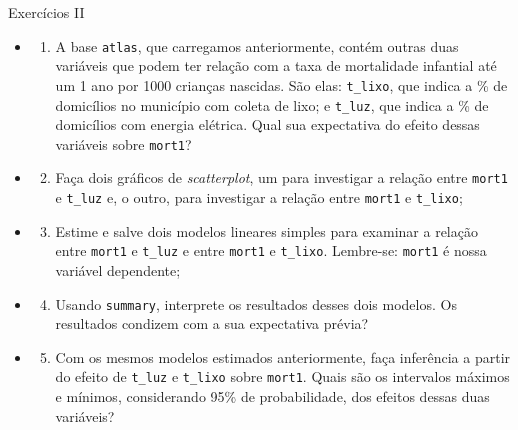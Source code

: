 \documentclass[
  9pt,
  ignorenonframetext,
  aspectratio=169]{beamer}
\providecommand{\tightlist}{%
  \setlength{\itemsep}{0pt}\setlength{\parskip}{0pt}}
\begin{document}
\begin{frame}[fragile]{Exercícios II}
\protect\hypertarget{exercuxedcios-ii}{}
\begin{itemize}
\item
  \begin{enumerate}
  [1)]
  \tightlist
  \item
    A base \texttt{atlas}, que carregamos anteriormente, contém outras
    duas variáveis que podem ter relação com a taxa de mortalidade
    infantial até um 1 ano por 1000 crianças nascidas. São elas:
    \texttt{t\_lixo}, que indica a \% de domicílios no município com
    coleta de lixo; e \texttt{t\_luz}, que indica a \% de domicílios com
    energia elétrica. Qual sua expectativa do efeito dessas variáveis
    sobre \texttt{mort1}?
  \end{enumerate}
\item
  \begin{enumerate}
  [1)]
  \setcounter{enumi}{1}
  \tightlist
  \item
    Faça dois gráficos de \emph{scatterplot}, um para investigar a
    relação entre \texttt{mort1} e \texttt{t\_luz} e, o outro, para
    investigar a relação entre \texttt{mort1} e \texttt{t\_lixo};
  \end{enumerate}
\item
  \begin{enumerate}
  [1)]
  \setcounter{enumi}{2}
  \tightlist
  \item
    Estime e salve dois modelos lineares simples para examinar a relação
    entre \texttt{mort1} e \texttt{t\_luz} e entre \texttt{mort1} e
    \texttt{t\_lixo}. Lembre-se: \texttt{mort1} é nossa variável
    dependente;
  \end{enumerate}
\item
  \begin{enumerate}
  [1)]
  \setcounter{enumi}{3}
  \tightlist
  \item
    Usando \texttt{summary}, interprete os resultados desses dois
    modelos. Os resultados condizem com a sua expectativa prévia?
  \end{enumerate}
\item
  \begin{enumerate}
  [1)]
  \setcounter{enumi}{4}
  \tightlist
  \item
    Com os mesmos modelos estimados anteriormente, faça inferência a
    partir do efeito de \texttt{t\_luz} e \texttt{t\_lixo} sobre
    \texttt{mort1}. Quais são os intervalos máximos e mínimos,
    considerando 95\% de probabilidade, dos efeitos dessas duas
    variáveis?
  \end{enumerate}
\end{itemize}
\end{frame}
\end{document}
